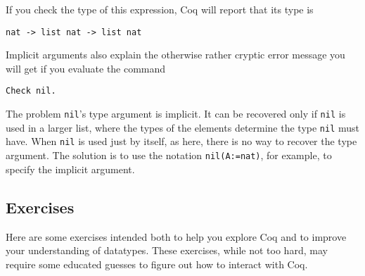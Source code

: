 \documentclass{book}[12pt]
\begin{document}
\noindent If you check the type of this expression, Coq will report
that its type is 

\begin{verbatim}
nat -> list nat -> list nat
\end{verbatim}

Implicit arguments also explain the otherwise rather cryptic error
message you will get if you evaluate the command

\begin{verbatim}
Check nil.
\end{verbatim}

\noindent The problem \texttt{nil}'s type argument is implicit. It can
be recovered only if \texttt{nil} is used in a larger list, where the
types of the elements determine the type \texttt{nil} must have.  When
\texttt{nil} is used just by itself, as here, there is no way to
recover the type argument.  The solution is to use the notation
\texttt{nil(A:=nat)}, for example, to specify the implicit argument.

\subsection{Exercises}

Here are some exercises intended both to help you explore Coq and to
improve your understanding of datatypes.  These exercises, while not
too hard, may require some educated guesses to figure out how to
interact with Coq.
\end{document}
